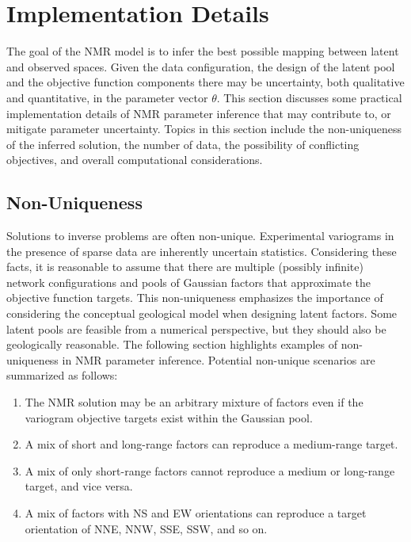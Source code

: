 \FloatBarrier
\section{Implementation Details}
\label{sec:04implementd}

The goal of the \gls{NMR} model is to infer the best possible mapping between latent and observed spaces. Given the data configuration, the design of the latent pool and the objective function components there may be uncertainty, both qualitative and quantitative, in the parameter vector $\theta$. This section discusses some practical implementation details of \gls{NMR} parameter inference that may contribute to, or mitigate parameter uncertainty. Topics in this section include the non-uniqueness of the inferred solution, the number of data, the possibility of conflicting objectives, and overall computational considerations.

\FloatBarrier
\subsection{Non-Uniqueness}
\label{subsec:04nonunique}

Solutions to inverse problems are often non-unique. Experimental variograms in the presence of sparse data are inherently uncertain statistics. Considering these facts, it is reasonable to assume that there are multiple (possibly infinite) network configurations and pools of Gaussian factors that approximate the objective function targets. This non-uniqueness emphasizes the importance of considering the conceptual geological model when designing latent factors. Some latent pools are feasible from a numerical perspective, but they should also be geologically reasonable. The following section highlights examples of non-uniqueness in \gls{NMR} parameter inference. Potential non-unique scenarios are summarized as follows:
\begin{enumerate}[noitemsep]
    \item The \gls{NMR} solution may be an arbitrary mixture of factors even if the variogram objective targets exist within the Gaussian pool.
    \item A mix of short and long-range factors can reproduce a medium-range target.
    \item A mix of only short-range factors cannot reproduce a medium or long-range target, and vice versa.
    \item A mix of factors with NS and EW orientations can reproduce a target orientation of NNE, NNW, SSE, SSW, and so on.
\end{enumerate}

